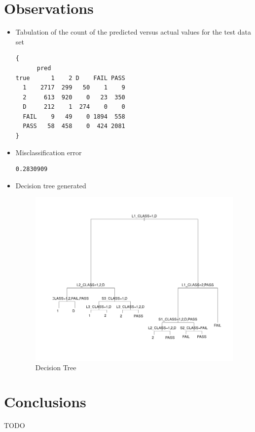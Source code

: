 \section*{Observations}
\begin{itemize}
\item Tabulation of the count of the predicted versus actual values for the test data set
\begin{lstlisting}
{
      pred
true      1    2 D    FAIL PASS
  1    2717  299   50    1    9
  2     613  920    0   23  350
  D     212    1  274    0    0
  FAIL    9   49    0 1894  558
  PASS   58  458    0  424 2081
}
\end{lstlisting}
\item Misclassification error
\begin{lstlisting}
0.2830909
\end{lstlisting}
\item Decision tree generated
\begin{figure}[h!]
  \caption{Decision Tree}
  \centering
    \includegraphics[scale=0.4]{img/rpart_nrc_class.png}
\end{figure}
\end{itemize}

\section*{Conclusions}
TODO